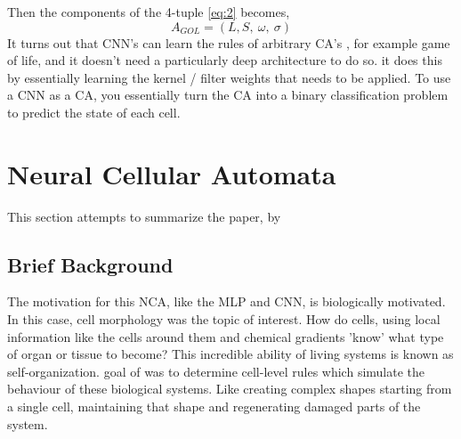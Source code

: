 Then the components of the 4-tuple \ref{eq:2} becomes,
\begin{equation}
	\label{eq:2.4}
	A_{GOL} = (L, S, \ \omega , \ \sigma )
\end{equation}
It turns out that CNN's can learn the rules of arbitrary CA's \cite{PhysRevE.100.032402}, for example game of life, and it doesn't need a particularly deep architecture to do so. it does this by essentially learning the kernel / filter weights that needs to be applied. To use a CNN as a CA, you essentially turn the CA into a binary classification problem to predict the state of each cell.

\section{Neural Cellular Automata}

This section attempts to summarize the paper,  by \citeauthor{growing_nca} \cite{growing_nca}
\subsection{Brief Background}

The motivation for this NCA, like the MLP and CNN, is biologically motivated. In this case, cell morphology was the topic of interest. How do cells, using local information like the cells around them and chemical gradients 'know' what type of organ or tissue to become? This incredible ability of living systems is known as self-organization. goal of \citeauthor{growing_nca} was to determine cell-level rules which simulate the behaviour of these biological systems. Like creating complex shapes  starting from a single cell, maintaining that shape and regenerating damaged parts of the system.


